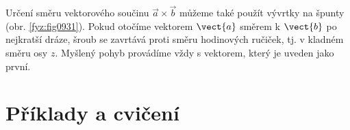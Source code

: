     \begin{tcnote}      
      Určení směru vektorového součinu \(\vec{a}\times\vec{b}\) můžeme také použít vývrtky na špunty
      (obr. \ref{fyz:fig0931}). Pokud otočíme vektorem \(\vect{a}\) směrem k \(\vect{b}\) po
      nejkratší dráze, šroub se zavrtává proti směru hodinových ručiček, tj. v kladném směru osy
      \(z\). Myšlený pohyb provádíme vždy s vektorem, který je uveden jako první.

      {\centering
        \captionsetup{type=figure} 
        \label{fyz:fig0931}
      \par}
    \end{tcnote}

  \section{Příklady a cvičení}\label{fyz:IchapXIsecVIII}
      
      
